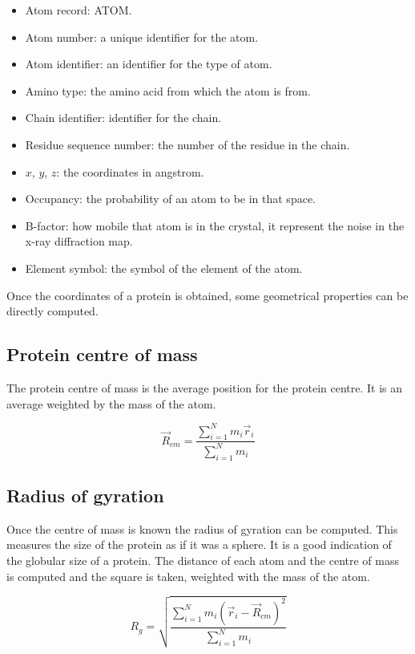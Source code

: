 \begin{multicols}{2}
	\begin{itemize}
		\item Atom record: ATOM.
		\item Atom number: a unique identifier for the atom.
		\item Atom identifier: an identifier for the type of atom.
		\item Amino type: the amino acid from which the atom is from.
		\item Chain identifier: identifier for the chain.
		\item Residue sequence number: the number of the residue in the chain.
		\item $x$, $y$, $z$: the coordinates in angstrom.
		\item Occupancy: the probability of an atom to be in that space.
		\item B-factor: how mobile that atom is in the crystal, it represent the noise in the x-ray diffraction map.
		\item Element symbol: the symbol of the element of the atom.
	\end{itemize}
\end{multicols}

Once the coordinates of a protein is obtained, some geometrical properties can be directly computed.

	\subsection{Protein centre of mass}
	The protein centre of mass is the average position for the protein centre.
	It is an average weighted by the mass of the atom.

	$$\vec{R}_{cm} = \frac{\sum\limits_{i=1}^Nm_i\vec{r}_i}{\sum\limits_{i=1}^Nm_i}$$

	\subsection{Radius of gyration}
	Once the centre of mass is known the radius of gyration can be computed.
	This measures the size of the protein as if it was a sphere.
	It is a good indication of the globular size of a protein.
	The distance of each atom and the centre of mass is computed and the square is taken, weighted with the mass of the atom.

	$$R_g = \sqrt{\frac{\sum\limits_{i=1}^Nm_i(\vec{r}_i-\vec{R}_{cm})^2}{\sum\limits_{i=1}^Nm_i}}$$


